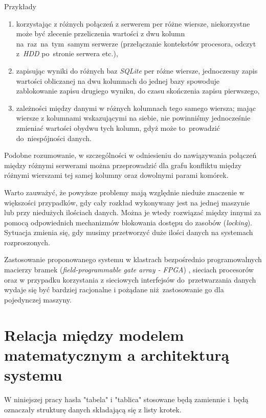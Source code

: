 \documentclass[brudnopis]{xmgr}
\begin{document}
Przykłady
\begin{enumerate}
    \item korzystając z różnych połączeń z serwerem per różne wiersze, niekorzystne może być zlecenie przeliczenia wartości z dwu kolumn\\
    na~raz~na~tym~samym serwerze (przełączanie kontekstów procesora, odczyt z~\emph{HDD} po~stronie serwera etc.),
    \item zapisując wyniki do różnych baz \emph{SQLite} per różne wiersze, jednoczesny zapis wartości obliczanej na dwu kolumnach do jednej bazy spowoduje zablokowanie zapisu drugiego wyniku, do czasu skończenia zapisu pierwszego,
    \item zależności między danymi w różnych kolumnach tego samego wiersza; mając wiersze z kolumnami wskazującymi na siebie, nie powinniśmy jednocześnie zmieniać wartości obydwu tych kolumn, gdyż może to~prowadzić do~niespójności danych.
\end{enumerate}
\medskip

Podobne rozumowanie, w szczególności w odniesieniu do nawiązywania połączeń między różnymi serwerami można przeprowadzić dla grafu konfliktu między różnymi wierszami tej samej kolumny oraz dowolnymi parami komórek.
\medskip

Warto zauważyć, że powyższe problemy mają względnie nieduże znaczenie w większości przypadków, gdy cały rozkład wykonywany jest na jednej maszynie lub przy niedużych ilościach danych. Można je wtedy rozwiązać między innymi za pomocą odpowiednich mechanizmów blokowania dostępu do zasobów (\emph{locking}).
Sytuacja zmienia się, gdy musimy przetworzyć duże ilości danych na systemach rozproszonych.
\medskip

Zastosowanie proponowanego systemu w klastrach bezpośrednio programowalnych macierzy bramek (\emph{field-programmable gate array - FPGA}) \cite{sadrozinski2016applications}, sieciach procesorów oraz w przypadku korzystania z sieciowych interfejsów do~przetwarzania danych wydaje się być bardziej racjonalne i pożądane niż~zastosowanie go dla pojedynczej maszyny.



\chapter{Relacja między modelem matematycznym a architekturą systemu}

W niniejszej pracy hasła "tabela" i "tablica" stosowane będą zamiennie i~będą oznaczały strukturę danych składającą się z listy krotek. 
\medskip
\end{document}

